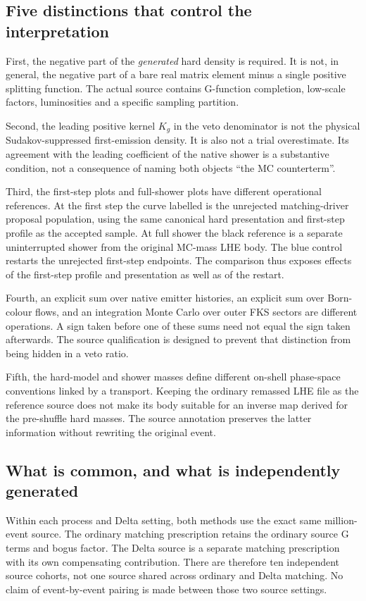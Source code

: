 \subsection{Five distinctions that control the interpretation}
First, the negative part of the \emph{generated} hard density is required.
It is not, in general, the negative part of a bare real matrix element
minus a single positive splitting function. The actual source contains
G-function completion, low-scale factors, luminosities and a specific
sampling partition.

Second, the leading positive kernel $K_g$ in the veto denominator is not
the physical Sudakov-suppressed first-emission density. It is also not a
trial overestimate. Its agreement with the leading coefficient of the
native shower is a substantive condition, not a consequence of naming
both objects ``the MC counterterm''.

Third, the first-step plots and full-shower plots have different
operational references. At the first step the curve labelled \mcatnlo{}
is the unrejected matching-driver proposal population, using the same
canonical hard presentation and first-step profile as the accepted
sample. At full shower the black reference is a separate uninterrupted
shower from the original MC-mass LHE body. The blue control restarts the
unrejected first-step endpoints. The comparison thus exposes effects of
the first-step profile and presentation as well as of the restart.

Fourth, an explicit sum over native emitter histories, an explicit sum
over Born-colour flows, and an integration Monte Carlo over outer FKS
sectors are different operations. A sign taken before one of these sums
need not equal the sign taken afterwards. The source qualification is
designed to prevent that distinction from being hidden in a veto ratio.

Fifth, the hard-model and shower masses define different on-shell
phase-space conventions linked by a transport. Keeping the ordinary remassed LHE file as
the reference source does not make its body suitable for an inverse map
derived for the pre-shuffle hard masses. The source annotation preserves
the latter information without rewriting the original event.

\subsection{What is common, and what is independently generated}
Within each process and Delta setting, both methods use the exact same
million-event source. The ordinary matching prescription retains the
ordinary source G terms and bogus factor. The Delta source is a separate
matching prescription with its own compensating contribution. There are
therefore ten independent source cohorts, not one source shared across
ordinary and Delta matching. No claim of event-by-event pairing is made
between those two source settings.

